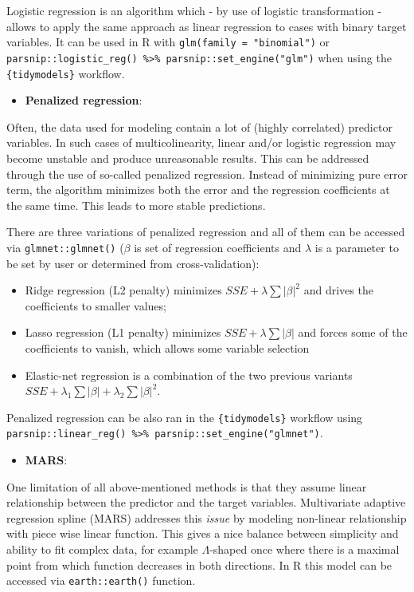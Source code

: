 \documentclass[
]{krantz}
\providecommand{\tightlist}{%
  \setlength{\itemsep}{0pt}\setlength{\parskip}{0pt}}
\begin{document}
Logistic regression is an algorithm which - by use of logistic transformation - allows to apply the same approach as linear regression to cases with binary target variables. It can be used in R with \texttt{glm(family\ =\ "binomial")} or \texttt{parsnip::logistic\_reg()\ \%\textgreater{}\%\ parsnip::set\_engine("glm")} when using the \texttt{\{tidymodels\}} workflow.

\begin{itemize}
\tightlist
\item
  \textbf{Penalized regression}:
\end{itemize}

Often, the data used for modeling contain a lot of (highly correlated) predictor variables. In such cases of multicolinearity, linear and/or logistic regression may become unstable and produce unreasonable results. This can be addressed through the use of so-called penalized regression. Instead of minimizing pure error term, the algorithm minimizes both the error and the regression coefficients at the same time. This leads to more stable predictions.

There are three variations of penalized regression and all of them can be accessed via \texttt{glmnet::glmnet()} (\(\beta\) is set of regression coefficients and \(\lambda\) is a parameter to be set by user or determined from cross-validation):

\begin{itemize}
\tightlist
\item
  Ridge regression (L2 penalty) minimizes \(SSE + \lambda \sum|\beta|^2\) and drives the coefficients to smaller values;
\item
  Lasso regression (L1 penalty) minimizes \(SSE + \lambda \sum|\beta|\) and forces some of the coefficients to vanish, which allows some variable selection
\item
  Elastic-net regression is a combination of the two previous variants \(SSE + \lambda_1 \sum|\beta| + \lambda_2 \sum|\beta|^2\).
\end{itemize}

Penalized regression can be also ran in the \texttt{\{tidymodels\}} workflow using \texttt{parsnip::linear\_reg()\ \%\textgreater{}\%\ parsnip::set\_engine("glmnet")}.

\begin{itemize}
\tightlist
\item
  \textbf{MARS}:
\end{itemize}

One limitation of all above-mentioned methods is that they assume linear relationship between the predictor and the target variables. Multivariate adaptive regression spline (MARS) addresses this \emph{issue} by modeling non-linear relationship with piece wise linear function. This gives a nice balance between simplicity and ability to fit complex data, for example \(\Lambda\)-shaped once where there is a maximal point from which function decreases in both directions. In R this model can be accessed via \texttt{earth::earth()} function.
\end{document}
